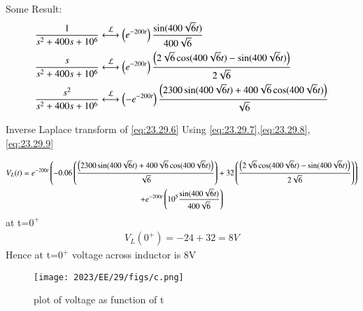 \documentclass[journal,12pt,twocolumn]{IEEEtran}
\theoremstyle{remark}
\begin{document}
Some Result:
\begin{align}
\frac{1}{s^2+400s+10^6} &\system{L} \brak{e^{-200t}}\frac{\sin(400\sqrt{6}t)}{400\sqrt{6}}
   \label{eq:23.29.7}\\
\frac{s}{s^2+400s+10^6} &\system{L} \brak{e^{-200t}}\frac{\brak{2\sqrt{6}\cos(400\sqrt{6}t)-\sin(400\sqrt{6}t)}}{2\sqrt{6}}
   \label{eq:23.29.8}\\
\frac{s^2}{s^2+400s+10^6} &\system{L} \brak{-e^{-200t}}\frac{\brak{2300\sin(400\sqrt{6}t)+400\sqrt{6}\cos(400\sqrt{6}t)}}{\sqrt{6}}
   \label{eq:23.29.9}
\end{align}

Inverse Laplace transform of \eqref{eq:23.29.6} Using \eqref{eq:23.29.7},\eqref{eq:23.29.8}, \eqref{eq:23.29.9}

\begin{multline}
	V_L(t)=e^{-200t}\left(-0.06\left(\frac{\left(2300\sin(400\sqrt{6}t)+400\sqrt{6}\cos(400\sqrt{6}t)\right)}{\sqrt{6}}\right)+32\left(\frac{\left(2\sqrt{6}\cos(400\sqrt{6}t)-\sin(400\sqrt{6}t)\right)}{2\sqrt{6}}\right)\right)\\+e^{-200t}\left(10^5\frac{\sin(400\sqrt{6}t)}{400\sqrt{6}}\right)
\end{multline}
at t=$0^+$
\begin{align}
    V_L(0^+)= -24+32=8V
\end{align}
Hence at t=$0^+$ voltage across inductor is 8V
\begin{figure}[!h]
    \centering
    \texttt{[image: 2023/EE/29/figs/c.png]}
    \caption{plot of voltage as function of t}
\end{figure}
\end{document}
